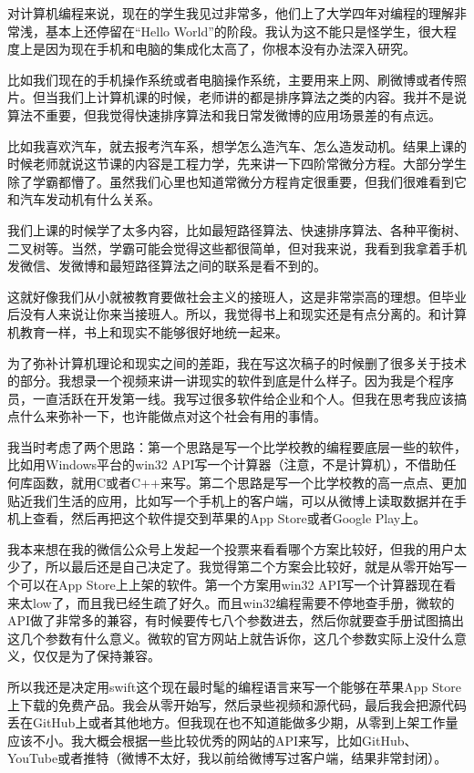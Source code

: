 \documentclass[
  letterpaper,
  DIV=11,
  numbers=noendperiod]{scrreprt}
\begin{document}
对计算机编程来说，现在的学生我见过非常多，他们上了大学四年对编程的理解非常浅，基本上还停留在``Hello
World''的阶段。我认为这不能只是怪学生，很大程度上是因为现在手机和电脑的集成化太高了，你根本没有办法深入研究。

比如我们现在的手机操作系统或者电脑操作系统，主要用来上网、刷微博或者传照片。但当我们上计算机课的时候，老师讲的都是排序算法之类的内容。我并不是说算法不重要，但我觉得快速排序算法和我日常发微博的应用场景差的有点远。

比如我喜欢汽车，就去报考汽车系，想学怎么造汽车、怎么造发动机。结果上课的时候老师就说这节课的内容是工程力学，先来讲一下四阶常微分方程。大部分学生除了学霸都懵了。虽然我们心里也知道常微分方程肯定很重要，但我们很难看到它和汽车发动机有什么关系。

我们上课的时候学了太多内容，比如最短路径算法、快速排序算法、各种平衡树、二叉树等。当然，学霸可能会觉得这些都很简单，但对我来说，我看到我拿着手机发微信、发微博和最短路径算法之间的联系是看不到的。

这就好像我们从小就被教育要做社会主义的接班人，这是非常崇高的理想。但毕业后没有人来说让你来当接班人。所以，我觉得书上和现实还是有点分离的。和计算机教育一样，书上和现实不能够很好地统一起来。

为了弥补计算机理论和现实之间的差距，我在写这次稿子的时候删了很多关于技术的部分。我想录一个视频来讲一讲现实的软件到底是什么样子。因为我是个程序员，一直活跃在开发第一线。我写过很多软件给企业和个人。但我在思考我应该搞点什么来弥补一下，也许能做点对这个社会有用的事情。

我当时考虑了两个思路：第一个思路是写一个比学校教的编程要底层一些的软件，比如用Windows平台的win32
API写一个计算器（注意，不是计算机），不借助任何库函数，就用C或者C++来写。第二个思路是写一个比学校教的高一点点、更加贴近我们生活的应用，比如写一个手机上的客户端，可以从微博上读取数据并在手机上查看，然后再把这个软件提交到苹果的App
Store或者Google Play上。

我本来想在我的微信公众号上发起一个投票来看看哪个方案比较好，但我的用户太少了，所以最后还是自己决定了。我觉得第二个方案会比较好，就是从零开始写一个可以在App
Store上上架的软件。第一个方案用win32
API写一个计算器现在看来太low了，而且我已经生疏了好久。而且win32编程需要不停地查手册，微软的API做了非常多的兼容，有时候要传七八个参数进去，然后你就要查手册试图搞出这几个参数有什么意义。微软的官方网站上就告诉你，这几个参数实际上没什么意义，仅仅是为了保持兼容。

所以我还是决定用swift这个现在最时髦的编程语言来写一个能够在苹果App
Store上下载的免费产品。我会从零开始写，然后录些视频和源代码，最后我会把源代码丢在GitHub上或者其他地方。但我现在也不知道能做多少期，从零到上架工作量应该不小。我大概会根据一些比较优秀的网站的API来写，比如GitHub、YouTube或者推特（微博不太好，我以前给微博写过客户端，结果非常封闭）。
\end{document}
